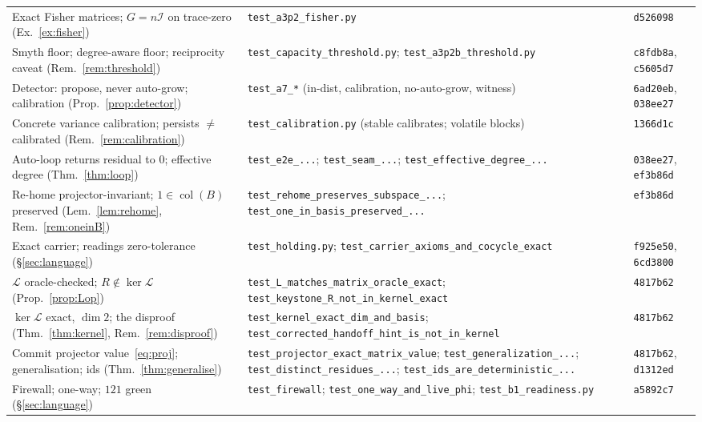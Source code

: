 \documentclass[11pt]{article}
\theoremstyle{plain}
\theoremstyle{definition}
\theoremstyle{remark}
\newcommand{\Fish}{\mathcal{I}}
\newcommand{\GG}{G}
\newcommand{\BB}{B}
\newcommand{\Lop}{\mathcal{L}}
\DeclareMathOperator{\col}{col}
\begin{document}
\begin{table}[ht]
\begin{tabular}{p{} p{} l}
Exact Fisher matrices; $\GG=n\Fish$ on trace-zero (Ex.~\ref{ex:fisher}) & \texttt{test\_a3p2\_fisher.py} & \texttt{d526098} \\
Smyth floor; degree-aware floor; reciprocity caveat (Rem.~\ref{rem:threshold}) & \texttt{test\_capacity\_threshold.py}; \texttt{test\_a3p2b\_threshold.py} & \texttt{c8fdb8a}, \texttt{c5605d7} \\
Detector: propose, never auto-grow; calibration (Prop.~\ref{prop:detector}) & \texttt{test\_a7\_*} (in-dist, calibration, no-auto-grow, witness) & \texttt{6ad20eb}, \texttt{038ee27} \\
Concrete variance calibration; persists $\neq$ calibrated (Rem.~\ref{rem:calibration}) & \texttt{test\_calibration.py} (stable calibrates; volatile blocks) & \texttt{1366d1c} \\
Auto-loop returns residual to $0$; effective degree (Thm.~\ref{thm:loop}) & \texttt{test\_e2e\_...}; \texttt{test\_seam\_...}; \texttt{test\_effective\_degree\_...} & \texttt{038ee27}, \texttt{ef3b86d} \\
Re-home projector-invariant; $1\in\col(\BB)$ preserved (Lem.~\ref{lem:rehome}, Rem.~\ref{rem:oneinB}) & \texttt{test\_rehome\_preserves\_subspace\_...}; \texttt{test\_one\_in\_basis\_preserved\_...} & \texttt{ef3b86d} \\
Exact carrier; readings zero-tolerance (\S\ref{sec:language}) & \texttt{test\_holding.py}; \texttt{test\_carrier\_axioms\_and\_cocycle\_exact} & \texttt{f925e50}, \texttt{6cd3800} \\
$\Lop$ oracle-checked; $R\notin\ker\Lop$ (Prop.~\ref{prop:Lop}) & \texttt{test\_L\_matches\_matrix\_oracle\_exact}; \texttt{test\_keystone\_R\_not\_in\_kernel\_exact} & \texttt{4817b62} \\
$\ker\Lop$ exact, $\dim 2$; the disproof (Thm.~\ref{thm:kernel}, Rem.~\ref{rem:disproof}) & \texttt{test\_kernel\_exact\_dim\_and\_basis}; \texttt{test\_corrected\_handoff\_hint\_is\_not\_in\_kernel} & \texttt{4817b62} \\
Commit projector value~\eqref{eq:proj}; generalisation; ids (Thm.~\ref{thm:generalise}) & \texttt{test\_projector\_exact\_matrix\_value}; \texttt{test\_generalization\_...}; \texttt{test\_distinct\_residues\_...}; \texttt{test\_ids\_are\_deterministic\_...} & \texttt{4817b62}, \texttt{d1312ed} \\
Firewall; one-way; $121$ green (\S\ref{sec:language}) & \texttt{test\_firewall}; \texttt{test\_one\_way\_and\_live\_phi}; \texttt{test\_b1\_readiness.py} & \texttt{a5892c7} \\

\end{tabular}
\end{table}
\end{document}
